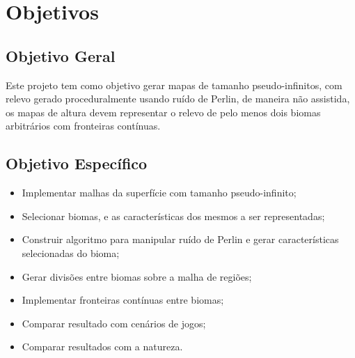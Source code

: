 \chapter{Objetivos}

\section{Objetivo Geral}
Este projeto tem como objetivo gerar mapas de tamanho pseudo-infinitos, com 
relevo gerado proceduralmente usando ruído 
de Perlin, de maneira não assistida, os mapas de altura devem representar o 
relevo de pelo menos dois biomas arbitrários com fronteiras contínuas.


\section{Objetivo Específico}

\begin{itemize}
    \item Implementar malhas da superfície com tamanho pseudo-infinito;
    \item Selecionar biomas, e as características dos mesmos a ser representadas;
    \item Construir algoritmo para manipular ruído de Perlin e gerar características
        selecionadas do bioma;
    \item Gerar divisões entre biomas sobre a malha de regiões;
    \item Implementar fronteiras contínuas entre biomas;
    \item Comparar resultado com cenários de jogos;
    \item Comparar resultados com a natureza.
\end{itemize}





